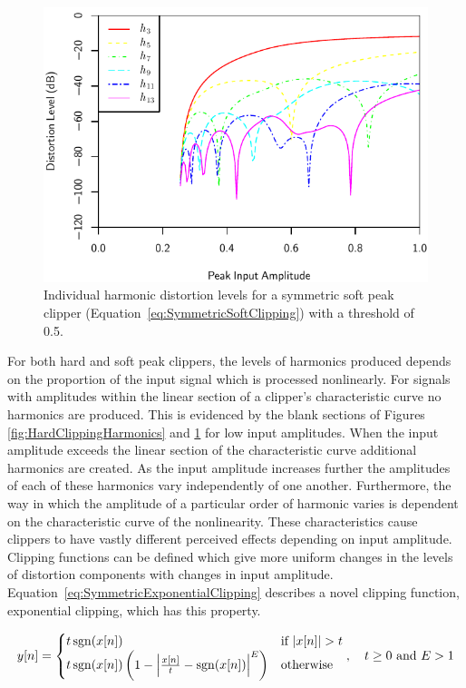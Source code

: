 			\begin{figure}[h!]
				\centering
				\includegraphics{chapter5/Images/SoftClippingHarmonics.pdf}
				\caption{Individual harmonic distortion levels for a symmetric soft peak clipper
					 (Equation~\ref{eq:SymmetricSoftClipping}) with a threshold of 0.5.}
				\label{fig:SoftClippingHarmonics}
			\end{figure}

			For both hard and soft peak clippers, the levels of harmonics produced depends on the proportion of
			the input signal which is processed nonlinearly. For signals with amplitudes within the linear
			section of a clipper's characteristic curve no harmonics are produced. This is evidenced by the
			blank sections of Figures \ref{fig:HardClippingHarmonics} and \ref{fig:SoftClippingHarmonics} for
			low input amplitudes. When the input amplitude exceeds the linear section of the characteristic
			curve additional harmonics are created. As the input amplitude increases further the amplitudes of
			each of these harmonics vary independently of one another. Furthermore, the way in which the
			amplitude of a particular order of harmonic varies is dependent on the characteristic curve of the
			nonlinearity. These characteristics cause clippers to have vastly different perceived effects
			depending on input amplitude. Clipping functions can be defined which give more uniform changes in
			the levels of distortion components with changes in input amplitude.
			Equation~\ref{eq:SymmetricExponentialClipping} describes a novel clipping function, exponential
			clipping, which has this property.
			
			\begin{equation}
				y[n] = \begin{cases}
					t\operatorname{sgn}(x[n]) & \text{if $\left|x[n]\right| > t$} \\
					t\operatorname{sgn}(x[n]) \left(1 - \left|\frac{x[n]}{t} - \operatorname{sgn}(x[n])\right|^{E} \right) &
						\text{otherwise}
				\end{cases}, \quad t \geq 0 \ \text{and} \ E > 1
				\label{eq:SymmetricExponentialClipping}
			\end{equation}

